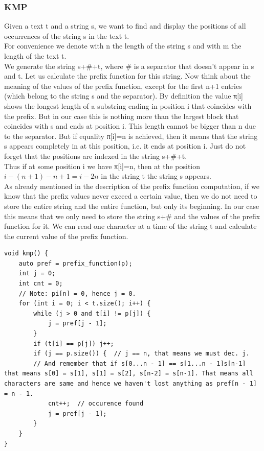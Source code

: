 \documentclass[8pt, a4paper, oneside, twocolumn]{extarticle}
\begin{document}
\subsubsection{KMP}
Given a text t and a string s, we want to find and display the positions of all occurrences of the string s in the text t.
\\For convenience we denote with n the length of the string s and with m the length of the text t.\\
We generate the string s+\#+t, where \# is a separator that doesn't appear in s and t. Let us calculate the prefix function for this string. Now think about the meaning of the values of the prefix function, except for the first n+1 entries (which belong to the string s and the separator). By definition the value π[i] shows the longest length of a substring ending in position i that coincides with the prefix. But in our case this is nothing more than the largest block that coincides with s and ends at position i. This length cannot be bigger than n due to the separator. But if equality π[i]=n is achieved, then it means that the string s appears completely in at this position, i.e. it ends at position i. Just do not forget that the positions are indexed in the string s+\#+t.\\
Thus if at some position i we have π[i]=n, then at the position $i - (n + 1) - n + 1 = i - 2n$ in the string t the string s appears.\\
As already mentioned in the description of the prefix function computation, if we know that the prefix values never exceed a certain value, then we do not need to store the entire string and the entire function, but only its beginning. In our case this means that we only need to store the string s+\# and the values of the prefix function for it. We can read one character at a time of the string t and calculate the current value of the prefix function.
\begin{verbatim}
void kmp() {
    auto pref = prefix_function(p);
    int j = 0;
    int cnt = 0;
	// Note: pi[n] = 0, hence j = 0.
    for (int i = 0; i < t.size(); i++) {
        while (j > 0 and t[i] != p[j]) {
            j = pref[j - 1];
        }
        if (t[i] == p[j]) j++;
        if (j == p.size()) {  // j == n, that means we must dec. j. 
		// And remember that if s[0...n - 1] == s[1...n - 1]s[n-1] that means s[0] = s[1], s[1] = s[2], s[n-2] = s[n-1]. That means all characters are same and hence we haven't lost anything as pref[n - 1] = n - 1.
            cnt++;  // occurence found
            j = pref[j - 1];
        }
    }
}
\end{verbatim}
\end{document}
